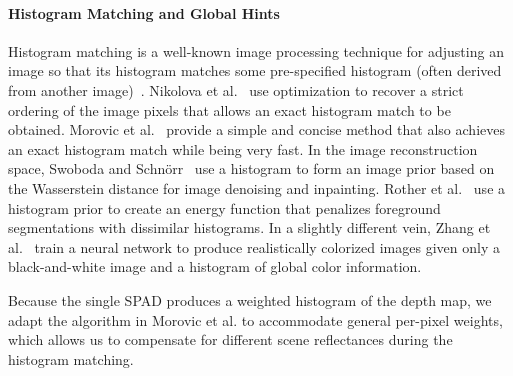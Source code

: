 \paragraph{Histogram Matching and Global Hints}
%
Histogram matching is a well-known image processing technique for adjusting an image so that its histogram matches some pre-specified histogram (often derived from another image)~\cite{gonzales1977gray,Gonzalez2008}. Nikolova et al.~\cite{Nikolova2013} use optimization to recover a strict ordering of the image pixels that allows an exact histogram match to be obtained. Morovic et al.~\cite{Morovic2002} provide a simple and concise method that also achieves an exact histogram match while being very fast. In the image reconstruction space, Swoboda and Schn\"orr~\cite{Swoboda2013} use a histogram to form an image prior based on the Wasserstein distance for image denoising and inpainting. Rother et al.~\cite{Rother2006} use a histogram prior to create an energy function that penalizes foreground segmentations with dissimilar histograms. In a slightly different vein, Zhang et al.~\cite{Zhang2017} train a neural network to produce realistically colorized images given only a black-and-white image and a histogram of global color information.

Because the single SPAD produces a weighted histogram of the depth map, we adapt
the algorithm in Morovic et al. to accommodate general per-pixel
weights, which allows us to compensate for different scene reflectances during
the histogram matching.
%


